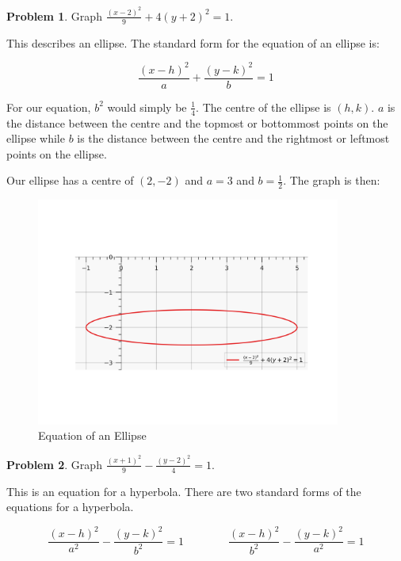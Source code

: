 \documentclass[12pt]{article}
\theoremstyle{definition}
\newtheorem{problem}{Problem}
\begin{document}
\begin{problem}
Graph $\displaystyle \frac{(x-2)^2}{9} + 4(y + 2 )^2 = 1$.
\end{problem}

This describes an ellipse. The standard form for the equation of an ellipse is:

\begin{equation}
    \frac{(x - h)^2}{a} + \frac{(y - k)^2}{b} = 1
\end{equation}

For our equation, $b^2$ would simply be $\frac{1}{4}$.
The centre of the ellipse is $(h, k)$.
$a$ is the distance between the centre and the topmost or bottommost points on the ellipse while $b$ is the distance between the centre and the rightmost or leftmost points on the ellipse.

Our ellipse has a centre of $(2, -2)$ and $a=3$ and $b=\frac{1}{2}$.
The graph is then:

\begin{figure}[H]
    \centering
    \includegraphics[width=10cm, keepaspectratio]{graph_6.png}
    \caption{Equation of an Ellipse}
    \label{fig:fig6}
\end{figure}

\begin{problem}
Graph $\displaystyle \frac{(x+1)^2}{9} - \frac{(y-2)^2}{4} = 1$.
\end{problem}

This is an equation for a hyperbola.
There are two standard forms of the equations for a hyperbola.

\begin{equation}
    \frac{(x-h)^2}{a^2} - \frac{(y-k)^2}{b^2} = 1 \qquad \qquad \frac{(x-h)^2}{b^2} - \frac{(y-k)^2}{a^2} = 1
\end{equation}
\end{document}
